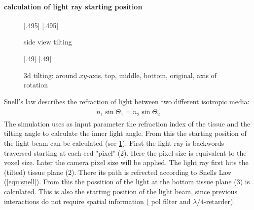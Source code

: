 \paragraph{calculation of light ray starting position}
% 
\begin{figure}[!t]
\def\tikzwidth{0.42\textwidth}
% 
[.495\textwidth]{
\def\tilt{0}
\def\nindex{2.25}
}
% 
[.495\textwidth]{
}
\caption{side view tilting}
\label{fig:tilted_side_view}
\end{figure}
% 
\begin{figure}[!t]
% 
\def\tikzheight{0.42\textwidth}
{}[.49\textwidth]{
}
% 
[.49\textwidth]{
}
% 
\tikzset{external/export=false}
\caption[3d tilting]{3d tilting: around $xy$-axis, \raisebox{.25em}{\tikz \draw[red,thick](0,0)--(0.25,0);} top, \raisebox{.25em}{\tikz \draw[green!50!black,thick](0,0)--(0.25,0);} middle, \raisebox{.25em}{\tikz \draw[blue,thick](0,0)--(0.25,0);} bottom, \raisebox{.25em}{\tikz \draw[dash pattern=on 1.25pt off 1.25pt,thick](0,0)--(0.25,0);} original, \raisebox{.25em}{\tikz \draw[gray](0,0)--(0.25,0);} axis of rotation }
\end{figure}
% 
Snell's law describes the refraction of light between two different isotropic media:
\begin{align}
\begin{split}
    n_1 \sin{\Theta_1} = n_2 \sin{\Theta_2}
\end{split}
\label{equ:snell}
\end{align}
% 
The simulation uses as input parameter the refraction index of the tissue and the tilting angle to calculate the inner light angle.
From this the starting position of the light beam can be calculated (see \cref{fig:tilted_side_view}):
% 
First the light ray is backwords traversed starting at each ccd "pixel" (2).
Here the pixel size is equivalent to the voxel size.
Later the camera pixel size will be applied.
The light ray first hits the (tilted) tissue plane (2).
There its path is refrected according to Snells Law (\cref{equ:snell}).
From this the possition of the light at the bottom tissue plane (3) is calculated.
This is also the starting position of the light beam, since previous interactions do not require spatial information (\ie{} pol filter and $\lambda/4$-retarder).\\

